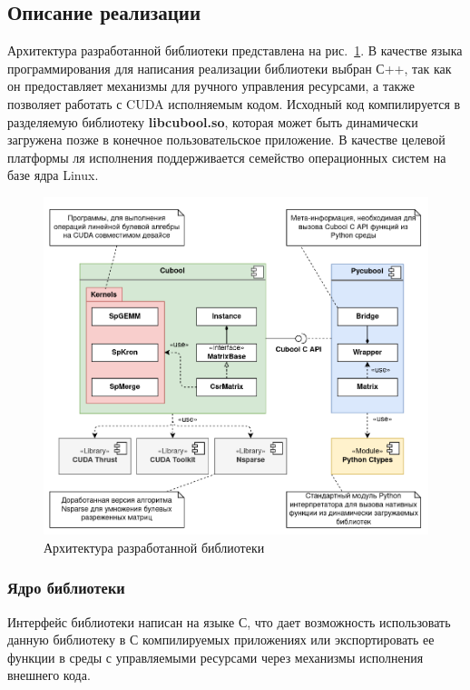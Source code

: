 \subsection{Описание реализации}

Архитектура разработанной библиотеки представлена на рис.~\ref{fig:cubool_architecture}. В качестве языка программирования для написания реализации библиотеки выбран С++, так как он предоставляет механизмы для ручного управления ресурсами, а также позволяет работать с CUDA исполняемым кодом. Исходный код компилируется в разделяемую библиотеку \textbf{libcubool.so}, которая может быть динамически загружена позже в конечное пользовательское приложение. В качестве целевой платформы ля исполнения поддерживается семейство операционных систем на базе ядра Linux.

\begin{figure}[h]
    \centering
    \includegraphics[width=1.0\textwidth]{images/library_architecture.png}
    \caption{Архитектура разработанной библиотеки}
    \label{fig:cubool_architecture}
\end{figure}

\subsubsection{Ядро библиотеки}

Интерфейс библиотеки написан на языке С, что дает возможность использовать данную библиотеку в С компилируемых приложениях или экспортировать ее функции в среды с управляемыми ресурсами через механизмы исполнения внешнего кода. 

